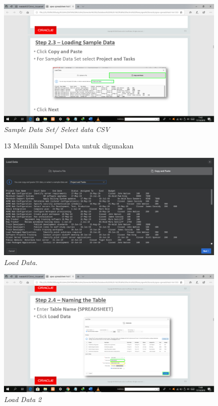 \begin{enumerate}
\begin{figure}
    \begin{center}
\includegraphics[scale=0.2]{figures/pict(9).png}
    \caption{\textit{Sample Data Set/ Select data CSV}}
        \end{center}
\label{gambar}
\end{figure}

\begin{figure}
\item[13] Memilih Sampel Data untuk digunakan

    \begin{center}
\includegraphics[scale=0.3]{figures/sampelData.png}
    \caption{\textit{Load Data.}}
        \end{center}
\label{gambar}
\end{figure}

\begin{figure}
    \begin{center}
\includegraphics[scale=0.2]{figures/pict(11).png}
    \caption{\textit{Load Data 2}}
        \end{center}
\label{gambar}
\end{figure}


\end{enumerate}
